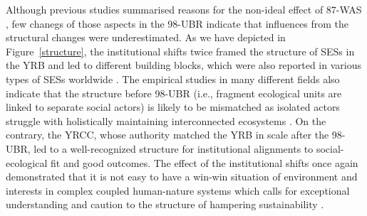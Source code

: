 Although previous studies summarised reasons for the non-ideal effect of 87-WAS \cite{huangang2002}, few chanegs of those aspects in the 98-UBR indicate that influences from the structural changes were underestimated.
As we have depicted in Figure~\ref{structure}, the institutional shifts twice framed the structure of SESs in the YRB and led to different building blocks, which were also reported in various types of SESs worldwide \cite{kluger2020,guerrero2015,bodin2012}.
The empirical studies in many different fields also indicate that the structure before 98-UBR (i.e., fragment ecological units are linked to separate social actors) is likely to be mismatched as isolated actors struggle with holistically maintaining interconnected ecosystems \cite{sayles2017,sayles2019,cai2016,bergsten2019}.
On the contrary, the YRCC, whose authority matched the YRB in scale after the 98-UBR, led to a well-recognized structure for institutional alignments to social-ecological fit and good outcomes.
The effect of the institutional shifts once again demonstrated that it is not easy to have a win-win situation of environment and interests in complex coupled human-nature systems \cite{hegwood2022} which calls for exceptional understanding and caution to the structure of hampering sustainability \cite{bergsten2019, sayles2019}.

